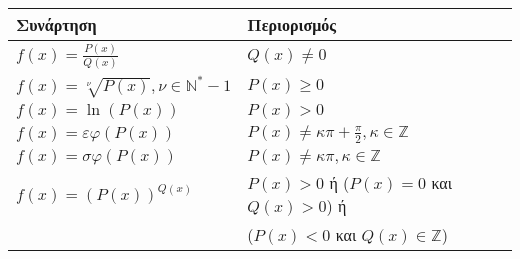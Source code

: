 \newpage

\begin{center}
\renewcommand{\arraystretch}{1.5} %
\begin{tabular}{|l|p{10cm}|}
\hline
\textbf{Συνάρτηση} & \textbf{Περιορισμός} \\
\hline
$f(x) = \frac{P(x)}{Q(x)}$   & $Q(x) \neq 0$ \\
\hline
$f(x) = \sqrt[\nu]{P(x)} , \nu \in \mathbb{N}^* - {1}$    & $P(x) \ge 0$ \\
\hline
$f(x) = \ln(P(x))$    & $P(x) > 0$ \\
\hline
$f(x) = \varepsilon\varphi(P(x))$        & $P(x) \ne \kappa\pi + \frac{\pi}{2}, \kappa \in \mathbb{Z}$ \\
\hline
$f(x) = \sigma\varphi(P(x))$     & $P(x) \ne \kappa\pi, \kappa \in \mathbb{Z}$ \\
\hline
$f(x) = (P(x))^{Q(x)}$     & $P(x) > 0$ ή ($P(x) = 0$ και $Q(x) > 0$) ή\\
&($P(x) < 0$ και $Q(x) \in \mathbb{Z}$)\\
\hline
\end{tabular}
\end{center}
